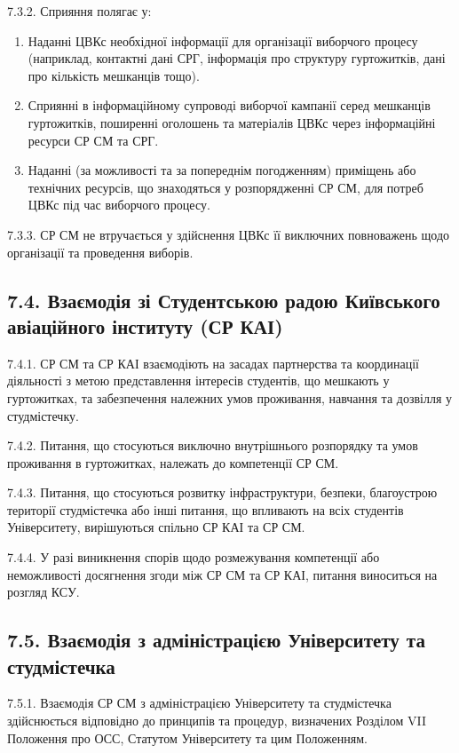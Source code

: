     7.3.2. Сприяння полягає у:

        \begin{enumerate}[label=\alph*)]
            \item Наданні ЦВКс необхідної інформації для організації виборчого процесу (наприклад, контактні дані СРГ, інформація про структуру гуртожитків, дані про кількість мешканців тощо).
            \item Сприянні в інформаційному супроводі виборчої кампанії серед мешканців гуртожитків, поширенні оголошень та матеріалів ЦВКс через інформаційні ресурси СР СМ та СРГ.
            \item Наданні (за можливості та за попереднім погодженням) приміщень або технічних ресурсів, що знаходяться у розпорядженні СР СМ, для потреб ЦВКс під час виборчого процесу.
        \end{enumerate}

    7.3.3. СР СМ не втручається у здійснення ЦВКс її виключних повноважень щодо організації та проведення виборів.

\subsection*{7.4. Взаємодія зі Студентською радою Київського авіаційного інституту (СР КАІ)}
    7.4.1. СР СМ та СР КАІ взаємодіють на засадах партнерства та координації діяльності з метою представлення інтересів студентів, що мешкають у гуртожитках, та забезпечення належних умов проживання, навчання та дозвілля у студмістечку.

    7.4.2. Питання, що стосуються виключно внутрішнього розпорядку та умов проживання в гуртожитках, належать до компетенції СР СМ.

    7.4.3. Питання, що стосуються розвитку інфраструктури, безпеки, благоустрою території студмістечка або інші питання, що впливають на всіх студентів Університету, вирішуються спільно СР КАІ та СР СМ.

    7.4.4. У разі виникнення спорів щодо розмежування компетенції або неможливості досягнення згоди між СР СМ та СР КАІ, питання виноситься на розгляд КСУ.

\subsection*{7.5. Взаємодія з адміністрацією Університету та студмістечка}
    7.5.1. Взаємодія СР СМ з адміністрацією Університету та студмістечка здійснюється відповідно до принципів та процедур, визначених Розділом VII Положення про ОСС, Статутом Університету та цим Положенням.

